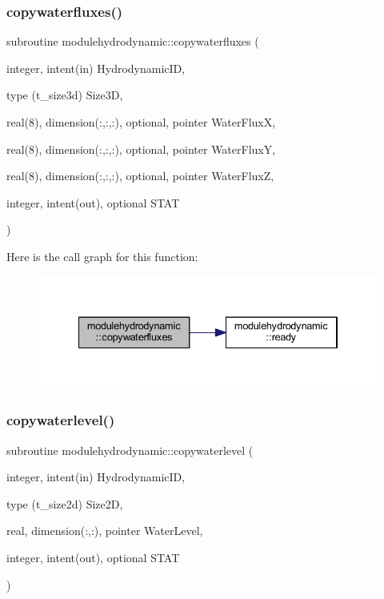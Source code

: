 \subsubsection{\texorpdfstring{copywaterfluxes()}{copywaterfluxes()}}
{\footnotesize\ttfamily subroutine modulehydrodynamic\+::copywaterfluxes (\begin{DoxyParamCaption}\item[{integer, intent(in)}]{Hydrodynamic\+ID,  }\item[{type (t\+\_\+size3d)}]{Size3D,  }\item[{real(8), dimension(\+:,\+:,\+:), optional, pointer}]{Water\+FluxX,  }\item[{real(8), dimension(\+:,\+:,\+:), optional, pointer}]{Water\+FluxY,  }\item[{real(8), dimension(\+:,\+:,\+:), optional, pointer}]{Water\+FluxZ,  }\item[{integer, intent(out), optional}]{S\+T\+AT }\end{DoxyParamCaption})\hspace{0.3cm}{\ttfamily [private]}}

Here is the call graph for this function\+:\nopagebreak
\begin{figure}[H]
\begin{center}
\leavevmode
\includegraphics[width=334pt]{namespacemodulehydrodynamic_a389c77d3103d5944ec90680d613d2e56_cgraph}
\end{center}
\end{figure}
\mbox{\label{namespacemodulehydrodynamic_a6a39453a1be66896cddce62126fa7bcc}} 
\subsubsection{\texorpdfstring{copywaterlevel()}{copywaterlevel()}}
{\footnotesize\ttfamily subroutine modulehydrodynamic\+::copywaterlevel (\begin{DoxyParamCaption}\item[{integer, intent(in)}]{Hydrodynamic\+ID,  }\item[{type (t\+\_\+size2d)}]{Size2D,  }\item[{real, dimension(\+:,\+:), pointer}]{Water\+Level,  }\item[{integer, intent(out), optional}]{S\+T\+AT }\end{DoxyParamCaption})\hspace{0.3cm}{\ttfamily [private]}}

